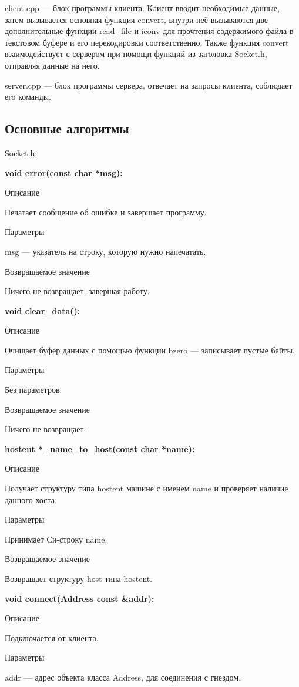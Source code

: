 \documentclass[a4paper,12pt]{extarticle}
\begin{document}
client.cpp --- блок программы клиента. Клиент вводит необходимые данные, затем вызывается основная функция convert, внутри неё вызываются две дополнительные функции read\_file и iconv для прочтения содержимого файла в текстовом буфере и его перекодировки соответственно. Также функция convert взаимодействует с сервером при помощи функций из заголовка Socket.h, отправляя данные на него.

sеrver.cpp --- блок программы сервера, отвечает на запросы клиента, соблюдает его команды. 

\subsection{Основные алгоритмы}
Socket.h:

\textbf{void error(const char *msg):}

Описание

Печатает сообщение об ошибке и завершает программу.

Параметры

msg --- указатель на строку, которую нужно напечатать.

Возвращаемое значение

Ничего не возвращает, завершая работу.

\textbf{void clear\_data():}

Описание

Очищает буфер данных с помощью функции bzero --- записывает пустые байты.

Параметры

Без параметров.

Возвращаемое значение

Ничего не возвращает.

\textbf{hostent *\_name\_to\_host(const char *name):}

Описание

Получает структуру типа hostent машине с именем name и проверяет наличие данного хоста.

Параметры

Принимает Си-строку name.

Возвращаемое значение

Возвращает структуру host типа hostent.

\textbf{void connect(Address const \&addr):}

Описание

Подключается от клиента.

Параметры

addr --- адрес объекта класса Address, для соединения с гнездом.
\end{document}
